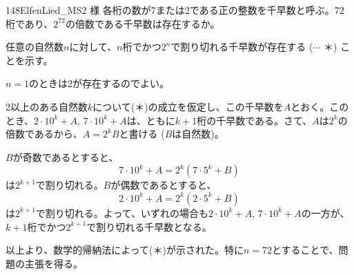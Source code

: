 \begin{thm}{148}{}{ElfenLied\_MS2 様}
 各桁の数が7または2である正の整数を千早数と呼ぶ。72桁であり、$2^{72}$の倍数である千早数は存在するか。
\end{thm}

任意の自然数$n$に対して、$n$桁でかつ$2^n$で割り切れる千早数が存在する ($\cdots$ ＊) ことを示す。

$n=1$のときは2が存在するのでよい。

2以上のある自然数$k$について(＊)の成立を仮定し、この千早数を$A$とおく。このとき、$2\cdot 10^k+A$, $7\cdot 10^k+A$は、ともに$k+1$桁の千早数である。さて、$A$は$2^k$の倍数であるから、$A=2^kB$と書ける ($B$は自然数)。

$B$が奇数であるとすると、
\[ 7\cdot 10^k+A=2^k(7\cdot 5^k+B) \]
は$2^{k+1}$で割り切れる。$B$が偶数であるとすると、
\[ 2\cdot 10^k+A=2^k(2\cdot 5^k+B) \]
は$2^{k+1}$で割り切れる。よって、いずれの場合も$2\cdot10^k+A$, $7\cdot 10^k+A$の一方が、$k+1$桁でかつ$2^{k+1}$で割り切れる千早数となる。

以上より、数学的帰納法によって(＊)が示された。特に$n=72$とすることで、問題の主張を得る。